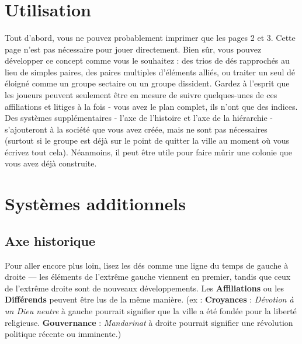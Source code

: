 \documentclass{article}
\begin{document}
\title{\vspace{-0.5cm}{\Huge One-Roll Societies} \vspace{-1cm}}

\date{}

\maketitle


\section*{Utilisation}
Tout d'abord, vous ne pouvez probablement imprimer que les pages 2 et 3. Cette page n'est pas nécessaire pour jouer directement.
Bien sûr, vous pouvez développer ce concept comme vous le souhaitez : des trios de dés rapprochés au lieu de simples paires, des paires multiples d'éléments alliés, ou traiter un seul dé éloigné comme un groupe sectaire ou un groupe dissident. Gardez à l'esprit que les joueurs peuvent seulement être en mesure de suivre quelques-unes de ces affiliations et litiges à la fois - vous avez le plan complet, ils n'ont que des indices. Des systèmes supplémentaires - l'axe de l'histoire et l'axe de la hiérarchie - s'ajouteront à la société que vous avez créée, mais ne sont pas nécessaires (surtout si le groupe est déjà sur le point de quitter la ville au moment où vous écrivez tout cela). Néanmoins, il peut être utile pour faire mûrir une colonie que vous avez déjà construite.


\section*{Systèmes additionnels}

\subsection*{Axe historique}
Pour aller encore plus loin, lisez les dés comme une ligne du temps de gauche à droite --- les éléments de l'extrême gauche viennent en premier, tandis que ceux de l'extrême droite sont de nouveaux développements. Les \textbf{Affiliations} ou les \textbf{Différends} peuvent être lus de la même manière. (ex : \textbf{Croyances} : \textit{Dévotion à un Dieu neutre} à gauche pourrait signifier que la ville a été fondée pour la liberté religieuse. \textbf{Gouvernance} : \textit{Mandarinat} à droite pourrait signifier une révolution politique récente ou imminente.)
\end{document}
